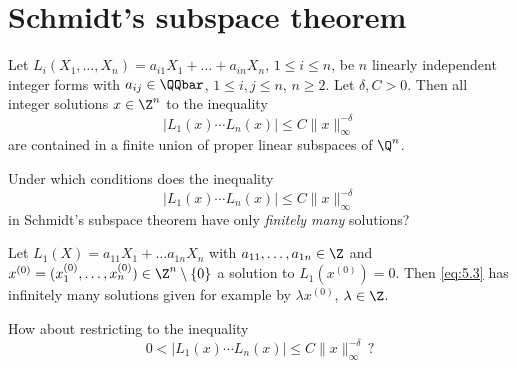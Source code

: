 \section{Schmidt's subspace theorem}

\begin{thm}[Schmidt, 1972]\label{thm:5.13} 
	Let \( L_i(X_1, \dotsc, X_n) = a_{i1} X_1 + \dots + a_{in} X_n \), \( 1 \leq i \leq n \), be \( n \) linearly independent integer forms with \( a_{ij} \in \QQbar \), \( 1 \leq i, j \leq n \), \( n \geq 2 \).
	Let \( \delta, C > 0 \).
	Then all integer solutions \( x \in \Z^n \) to the inequality
	\[ |L_1(x) \dotsm L_n(x)| \leq C \|x\|_\infty^{-\delta} \]
	are contained in a finite union of proper linear subspaces of \( \Q^n \).
\end{thm}


\begin{frage*}
	Under which conditions does the inequality
	\begin{equation}\label{eq:5.3}
		|L_1(x) \dotsm L_n(x)| \leq C \|x\|_\infty^{-\delta}
	\end{equation}
	in Schmidt's subspace theorem have only \emph{finitely many} solutions?
\end{frage*}

\begin{exmp*}
	Let \( L_1(X) = a_{11} X_1 + \dots a_{1n} X_n \) with \( a_{11}, \dotsc, a_{1n} \in \Z \) and \( x^{(0)} = (x_1^{(0)}, \dotsc, x_n^{(0)}) \in \Z^n \setminus \{0\} \) a solution to \( L_1(x^{(0)}) = 0 \).
	Then \eqref{eq:5.3} has infinitely many solutions given for example by \( \lambda x^{(0)} \), \( \lambda \in \Z \).
\end{exmp*}

\begin{frage*}
	How about restricting to the inequality
	\[ 0 < |L_1(x) \dotsm L_n(x)| \leq C \|x\|_\infty^{-\delta} \,? \]
\end{frage*}